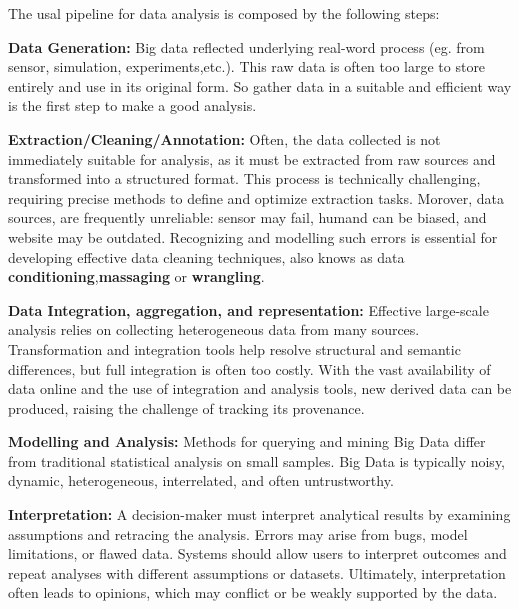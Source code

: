     The usal pipeline for data analysis is composed by the following steps:
    \begin{compactitemize}
        \item \textbf{Data Generation:} Big data reflected underlying real-word process (eg. from sensor, simulation, experiments,etc.). This raw data is often too large to store entirely and use in its original form.
                                         So gather data in a suitable and efficient way is the first step to make a good analysis.
        \item \textbf{Extraction/Cleaning/Annotation:} Often, the data collected is not immediately suitable for analysis, as it must be extracted from raw sources and transformed into a structured format. This process is technically challenging, requiring precise methods to define and optimize extraction tasks. 
                                                        Morover, data sources, are frequently unreliable: sensor may fail, humand can be biased, and website may be outdated. Recognizing and modelling such errors is essential for developing effective data cleaning techniques, also knows as data \textbf{conditioning},\textbf{massaging} or \textbf{wrangling}.
        \item \textbf{Data Integration, aggregation, and representation:} Effective large-scale analysis relies on collecting heterogeneous data from many sources. Transformation and integration tools help resolve structural and semantic differences, but full integration is often too costly. With the vast availability of data online and the use of integration and analysis tools, new derived data can be produced, raising the challenge of tracking its provenance.
        \item \textbf{Modelling and Analysis:} Methods for querying and mining Big Data differ from traditional statistical analysis on small samples. Big Data is typically noisy, dynamic, heterogeneous, interrelated, and often untrustworthy.
        \item \textbf{Interpretation:} A decision-maker must interpret analytical results by examining assumptions and retracing the analysis. Errors may arise from bugs, model limitations, or flawed data. Systems should allow users to interpret outcomes and repeat analyses with different assumptions or datasets. Ultimately, interpretation often leads to opinions, which may conflict or be weakly supported by the data.
    \end{compactitemize}


